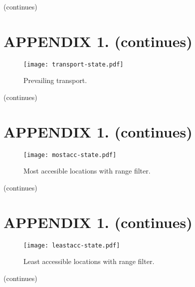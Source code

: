\vfill
\begin{flushright}
  (continues)
\end{flushright}

\thispagestyle{empty}
\section*{APPENDIX 1. (continues)}

\vfill

\begin{figure}[ht]
  \centering
  \captionsetup{justification=centering,margin=0.2cm}
  \texttt{[image: transport-state.pdf]}
  \caption{Prevailing transport.}
  \label{pic:transportstate}
\end{figure}

\vfill
\begin{flushright}
  (continues)
\end{flushright}

\thispagestyle{empty}
\section*{APPENDIX 1. (continues)}

\vfill

\begin{figure}[ht]
  \centering
  \captionsetup{justification=centering,margin=0.2cm}
  \texttt{[image: mostacc-state.pdf]}
  \caption{Most accesible locations with range filter.}
  \label{pic:mostaccstate}
\end{figure}

\vfill
\begin{flushright}
  (continues)
\end{flushright}

\thispagestyle{empty}
\section*{APPENDIX 1. (continues)}

\vfill

\begin{figure}[ht]
  \centering
  \captionsetup{justification=centering,margin=0.2cm}
  \texttt{[image: leastacc-state.pdf]}
  \caption{Least accessible locations with range filter.}
  \label{pic:leastaccstate}
\end{figure}

\vfill
\begin{flushright}
  (continues)
\end{flushright}

